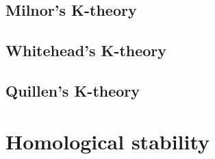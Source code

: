 \documentclass{book}
\begin{document}
\section{Milnor's K-theory}


\section{Whitehead's K-theory}

\section{Quillen's K-theory}



\chapter{Homological stability}
\end{document}
